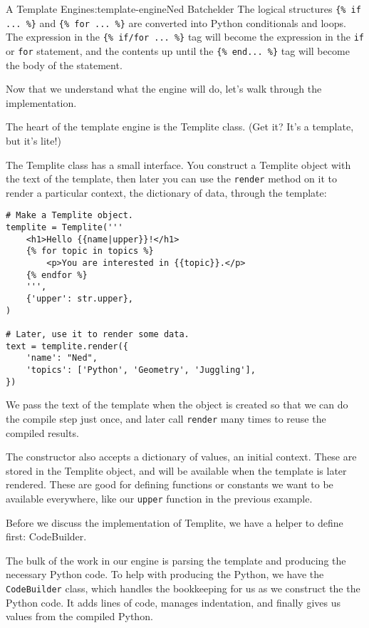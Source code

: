 \begin{aosachapter}{A Template Engine}{s:template-engine}{Ned Batchelder}
The logical structures \texttt{\{\% if ... \%\}} and
\texttt{\{\% for ... \%\}} are converted into Python conditionals and
loops. The expression in the \texttt{\{\% if/for ... \%\}} tag will
become the expression in the \texttt{if} or \texttt{for} statement, and
the contents up until the \texttt{\{\% end... \%\}} tag will become the
body of the statement.

\label{writing-the-engine}

Now that we understand what the engine will do, let's walk through the
implementation.

\label{the-templite-class}

The heart of the template engine is the Templite class. (Get it? It's a
template, but it's lite!)

The Templite class has a small interface. You construct a Templite
object with the text of the template, then later you can use the
\texttt{render} method on it to render a particular context, the
dictionary of data, through the template:

\begin{verbatim}
# Make a Templite object.
templite = Templite('''
    <h1>Hello {{name|upper}}!</h1>
    {% for topic in topics %}
        <p>You are interested in {{topic}}.</p>
    {% endfor %}
    ''',
    {'upper': str.upper},
)

# Later, use it to render some data.
text = templite.render({
    'name': "Ned",
    'topics': ['Python', 'Geometry', 'Juggling'],
})
\end{verbatim}

We pass the text of the template when the object is created so that we
can do the compile step just once, and later call \texttt{render} many
times to reuse the compiled results.

The constructor also accepts a dictionary of values, an initial context.
These are stored in the Templite object, and will be available when the
template is later rendered. These are good for defining functions or
constants we want to be available everywhere, like our \texttt{upper}
function in the previous example.

Before we discuss the implementation of Templite, we have a helper to
define first: CodeBuilder.

\label{codebuilder}

The bulk of the work in our engine is parsing the template and producing
the necessary Python code. To help with producing the Python, we have
the \texttt{CodeBuilder} class, which handles the bookkeeping for us as
we construct the the Python code. It adds lines of code, manages
indentation, and finally gives us values from the compiled Python.


\end{aosachapter}
